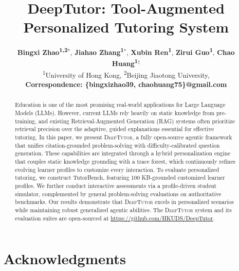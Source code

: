 \documentclass[11pt]{article}
\author{
 \textbf{Bingxi Zhao\textsuperscript{1,2}$^*$},
 \textbf{Jiahao Zhang\textsuperscript{1}$^*$},
 \textbf{Xubin Ren\textsuperscript{1}},
 \textbf{Zirui Guo\textsuperscript{1}},
 \textbf{Chao Huang\textsuperscript{1}$^\dagger$}
\\
 \textsuperscript{1}University of Hong Kong,
 \textsuperscript{2}Beijing Jiaotong University,
\\
 \small{
   \textbf{Correspondence: \{bingxizhao39, chaohuang75\}@gmail.com} 
 }
}
\begin{document}
\title{DeepTutor: Tool-Augmented Personalized Tutoring System}
\maketitle

\begin{abstract}
\renewcommand{\thefootnote}{}%
%
\renewcommand{\thefootnote}{\arabic{footnote}}%
\setcounter{footnote}{0}%
Education is one of the most promising real-world applications for Large Language Models (LLMs). However, current LLMs rely heavily on static knowledge from pre-training, and existing Retrieval-Augmented Generation (RAG) systems often prioritize retrieval precision over the adaptive, guided explanations essential for effective tutoring. 
In this paper, we present \textsc{DeepTutor}, a fully open-source agentic framework that unifies citation-grounded problem-solving with difficulty-calibrated question generation. 
These capabilities are integrated through a hybrid personalization engine that couples static knowledge grounding with a trace forest, which continuously refines evolving learner profiles to customize every interaction. 
To evaluate personalized tutoring, we construct TutorBench, featuring 100 KB-grounded customized learner profiles. 
We further conduct interactive assessments via a profile-driven student simulator, complemented by general problem-solving evaluations on authoritative benchmarks. 
Our results demonstrate that \textsc{DeepTutor} excels in personalized scenarios while maintaining robust generalized agentic abilities. 
The \textsc{DeepTutor} system and its evaluation suites are open-sourced at \url{https://github.com/HKUDS/DeepTutor}.
\end{abstract}








\section*{Acknowledgments}



\appendix

\end{document}
